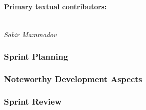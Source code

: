 \paragraph{Primary textual contributors:}
\mbox{}\\\emph{Sabir Mammadov}

\subsubsection{Sprint Planning}


\subsubsection{Noteworthy Development Aspects}


\subsubsection{Sprint Review}
